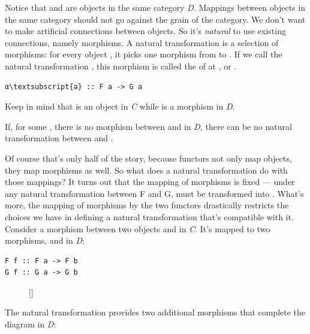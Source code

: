 \noindent
Notice that  and  are objects in the same
category \emph{D}. Mappings between objects in the same category should
not go against the grain of the category. We don't want to make
artificial connections between objects. So it's \emph{natural} to use
existing connections, namely morphisms. A natural transformation is a
selection of morphisms: for every object , it picks one
morphism from  to . If we call the natural
transformation , this morphism is called the 
of  at , or .

\begin{Verbatim}[commandchars=\\\{\}]
α\textsubscript{a} :: F a -> G a
\end{Verbatim}
Keep in mind that  is an object in \emph{C} while 
is a morphism in \emph{D}.

If, for some , there is no morphism between  and
 in \emph{D}, there can be no natural transformation
between  and .

Of course that's only half of the story, because functors not only map
objects, they map morphisms as well. So what does a natural
transformation do with those mappings? It turns out that the mapping of
morphisms is fixed --- under any natural transformation between F and G,
 must be transformed into . What's more, the
mapping of morphisms by the two functors drastically restricts the
choices we have in defining a natural transformation that's compatible
with it. Consider a morphism  between two objects 
and  in \emph{C}. It's mapped to two morphisms, 
and  in \emph{D}:

\begin{Verbatim}[commandchars=\\\{\}]
F f :: F a -> F b
G f :: G a -> G b
\end{Verbatim}

\begin{figure}
\raisebox{0pt}[\dimexpr{}\baselineskip\relax]{
}%
\end{figure}
\noindent
The natural transformation  provides two additional morphisms
that complete the diagram in \emph{D}:

